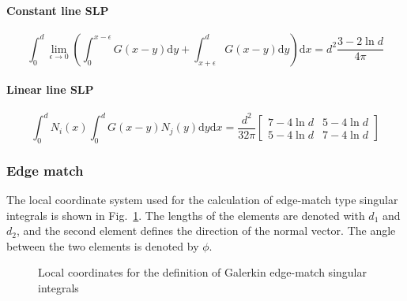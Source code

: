 \documentclass[a4paper,11pt]{article}
\newcommand{\td}{\mathrm{d}}
\begin{document}
\paragraph{Constant line SLP}

\begin{equation}
\int_{0}^{d}
\lim_{\epsilon \to 0}
\left(
\int_{0}^{x-\epsilon} G(x-y) \td y
+
\int_{x+\epsilon}^{d} G(x-y) \td y
\right)
\td x
=
d^2\frac{3-2\ln d}{4\pi}
\end{equation}

\paragraph{Linear line SLP}

\begin{equation}
\int_{0}^{d} N_i(x) \int_{0}^{d} G(x-y) N_j(y) \td y \td x
=
\frac{d^2}{32\pi} \begin{bmatrix}
7-4 \ln d & 5 - 4 \ln d \\
5-4 \ln d & 7 - 4 \ln d
\end{bmatrix}
\end{equation}

\subsubsection{Edge match}

The local coordinate system used for the calculation of edge-match type singular integrals is shown in Fig.~\ref{fig:local_galerkin_edge}. The lengths of the elements are denoted with $d_1$ and $d_2$, and the second element defines the direction of the normal vector. The angle between the two elements is denoted by $\phi$.

\begin{figure}
\center
{}
\caption{Local coordinates for the definition of Galerkin edge-match singular integrals}
\label{fig:local_galerkin_edge}
\end{figure}
\end{document}
